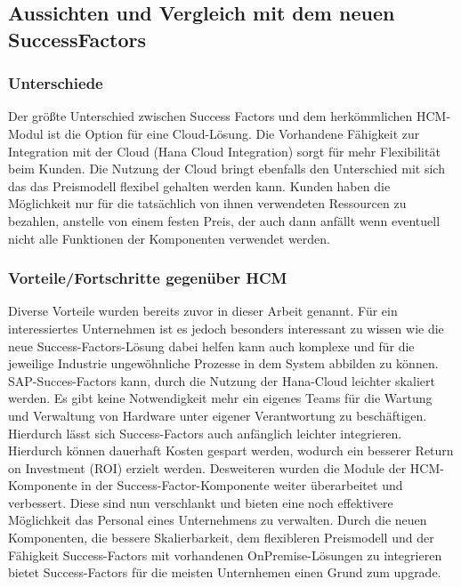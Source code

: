 \subsection{Aussichten und Vergleich mit dem neuen SuccessFactors}
\subsubsection{Unterschiede}
Der größte Unterschied zwischen Success Factors und dem herkömmlichen HCM-Modul ist die Option für eine Cloud-Lösung. Die Vorhandene Fähigkeit zur Integration mit der Cloud (Hana Cloud Integration) sorgt für mehr Flexibilität beim Kunden. Die Nutzung der Cloud bringt ebenfalls den Unterschied mit sich das das Preismodell flexibel gehalten werden kann. Kunden haben die Möglichkeit nur für die tatsächlich von ihnen verwendeten Ressourcen zu bezahlen, anstelle von einem festen Preis, der auch dann anfällt wenn eventuell nicht alle Funktionen der Komponenten verwendet werden. 

\subsubsection{Vorteile/Fortschritte gegenüber HCM}
Diverse Vorteile wurden bereits zuvor in dieser Arbeit genannt. Für ein interessiertes Unternehmen ist es jedoch besonders interessant zu wissen wie die neue Success-Factors-Lösung dabei helfen kann auch komplexe und für die jeweilige Industrie ungewöhnliche Prozesse in dem System abbilden zu können. SAP-Succes-Factors kann, durch die Nutzung der Hana-Cloud leichter skaliert werden. Es gibt keine Notwendigkeit mehr ein eigenes Teams für die Wartung und Verwaltung von Hardware unter eigener Verantwortung zu beschäftigen. Hierdurch lässt sich Success-Factors auch anfänglich leichter integrieren. Hierdurch können dauerhaft Kosten gespart werden, wodurch ein besserer Return on Investment (ROI) erzielt werden. Desweiteren wurden die Module der HCM-Komponente in der Success-Factor-Komponente weiter überarbeitet und verbessert. Diese sind nun verschlankt und bieten eine noch effektivere Möglichkeit das Personal eines Unternehmens zu verwalten. Durch die neuen Komponenten, die bessere Skalierbarkeit, dem flexibleren Preismodell und der Fähigkeit Success-Factors mit vorhandenen OnPremise-Lösungen zu integrieren bietet Success-Factors für die meisten Unternhemen einen Grund zum upgrade. 